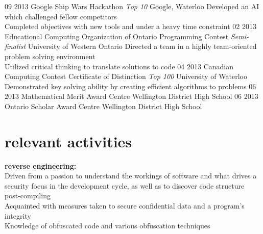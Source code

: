 \documentclass[]{friggeri-cv}
\begin{document}
\begin{entrylist}
  \entry
  	{09 2013}
  	{Google Ship Wars Hackathon \textsf{\em{Top 10}}}
  	{Google, Waterloo}
  	{Developed an AI which challenged fellow competitors \\
  	 Completed objectives with new tools and under a heavy time constraint}
  \entry
  	{02 2013}
  	{Educational Computing Organization of Ontario Programming Contest \textsf{\em{Semi-finalist}}}
  	{University of Western Ontario}
  	{Directed a team in a highly team-oriented problem solving environment \\
  	 Utilized critical thinking to translate solutions to code}
  \entry
	{04 2013}  	
  	{Canadian Computing Contest Certificate of Distinction \textsf{\em{Top 100}}}
  	{University of Waterloo}
  	{Demonstrated key solving ability by creating efficient algorithms to problems}
  \entry
  	{06 2013}
  	{Mathematical Merit Award}
  	{Centre Wellington District High School}
  	{}
  \entry
  	{06 2013}
  	{Ontario Scholar Award}
  	{Centre Wellington District High School}
  	{}

\end{entrylist}

\section{relevant activities}
{\bf reverse engineering: }\\
Driven from a passion to understand the workings of software and what drives a security focus \hspace*{5mm} in the development cycle, as well as to discover code structure post-compiling \\
Acquainted with measures taken to secure confidential data and a program's integrity \\
Knowledge of obfuscated code and various obfuscation techniques \\
\end{document}
